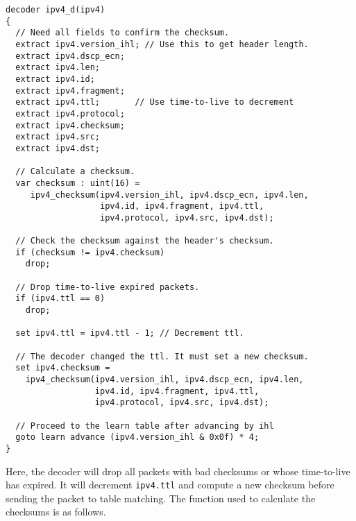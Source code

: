 \begin{codepage}
\begin{lstlisting}
decoder ipv4_d(ipv4)
{
  // Need all fields to confirm the checksum.
  extract ipv4.version_ihl; // Use this to get header length.
  extract ipv4.dscp_ecn;
  extract ipv4.len;
  extract ipv4.id;
  extract ipv4.fragment;
  extract ipv4.ttl;       // Use time-to-live to decrement
  extract ipv4.protocol;
  extract ipv4.checksum;
  extract ipv4.src;
  extract ipv4.dst;

  // Calculate a checksum.
  var checksum : uint(16) =
     ipv4_checksum(ipv4.version_ihl, ipv4.dscp_ecn, ipv4.len, 
                   ipv4.id, ipv4.fragment, ipv4.ttl, 
                   ipv4.protocol, ipv4.src, ipv4.dst);

  // Check the checksum against the header's checksum.
  if (checksum != ipv4.checksum)
    drop;

  // Drop time-to-live expired packets.
  if (ipv4.ttl == 0)
    drop;

  set ipv4.ttl = ipv4.ttl - 1; // Decrement ttl.

  // The decoder changed the ttl. It must set a new checksum.
  set ipv4.checksum =
    ipv4_checksum(ipv4.version_ihl, ipv4.dscp_ecn, ipv4.len, 
                  ipv4.id, ipv4.fragment, ipv4.ttl, 
                  ipv4.protocol, ipv4.src, ipv4.dst);

  // Proceed to the learn table after advancing by ihl
  goto learn advance (ipv4.version_ihl & 0x0f) * 4;
}
\end{lstlisting}
\end{codepage}

Here, the decoder will drop all packets with bad checksums or whose time-to-live has expired. It will decrement \texttt{ipv4.ttl} and compute a new checksum before sending the packet to table matching. The function used to calculate the checksums is as follows.

